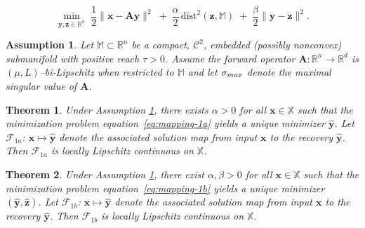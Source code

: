\documentclass[10pt,a4paper]{amsart}
\newtheorem{assumption}{Assumption}
\newtheorem{theorem}{Theorem}
\def\cC{{\mathcal{C}}}
\def\cF{{\mathcal{F}}}
\def\eqref#1{equation~\ref{#1}}
\def\mA{{\bm{A}}}
\def\sM{{\mathbb{M}}}
\def\sR{{\mathbb{R}}}
\def\sX{{\mathbb{X}}}
\def\vx{{\bm{x}}}
\def\vy{{\bm{y}}}
\def\vz{{\bm{z}}}
\begin{document}
\begin{equation}
\label{eq:mapping-1b}
\min_{\vy,\vz\in\sR^n}\;\frac{1}{2}\|\vx-\mA\vy\|^2 \;+\; \frac{\alpha}{2}\,\mathrm{dist}^2(\vz,\sM) \;+\; \frac{\beta}{2}\|\vy-\vz\|^2.
\end{equation}

\begin{assumption}
\label{assume:M}
Let $\sM\subset\sR^n$ be a compact, $\cC^2$, embedded (possibly nonconvex) submanifold with positive reach $\tau>0$. Assume the forward operator $\mA:\sR^n\!\to\!\sR^d$ is $(\mu,L)$–bi-Lipschitz when restricted to $\sM$ and let $\sigma_{\textup{max}}$ denote the maximal singular value of $\mA$.
\end{assumption}

\begin{theorem}
\label{thm:inverse-lip-1a}
Under Assumption \ref{assume:M}, there exists $\alpha > 0$ for all $\vx \in \sX$ such that the minimization problem \eqref{eq:mapping-1a} yields a unique minimizer $\hat{\vy}$. Let $\cF_{1a}$: $\vx \mapsto \hat{\vy}$ denote the associated solution map from input $\vx$ to the recovery $\hat{\vy}$. Then $\cF_{1a}$ is locally Lipschitz continuous on $\sX$.
\end{theorem}

\begin{theorem}
\label{thm:inverse-lip-1b}
Under Assumption \ref{assume:M}, there exist $\alpha,\beta > 0$ for all $\vx \in \sX$ such that the minimization problem \eqref{eq:mapping-1b} yields a unique minimizer $(\hat{\vy},\hat{\vz})$. Let $\cF_{1b}$: $\vx \mapsto \hat{\vy}$ denote the associated solution map from input $\vx$ to the recovery $\hat{\vy}$. Then $\cF_{1b}$ is locally Lipschitz continuous on $\sX$.
\end{theorem}
\end{document}
